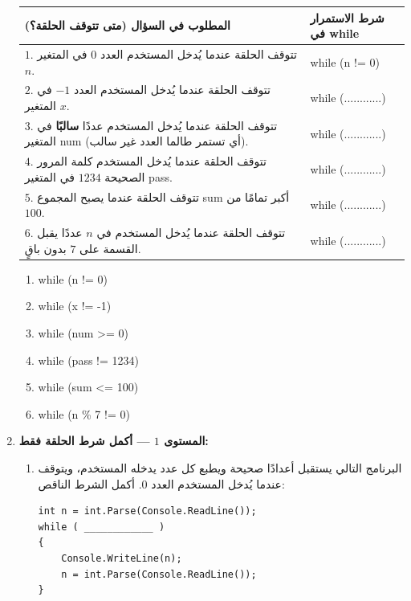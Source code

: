 \documentclass[14pt]{extarticle}
\begin{document}
\begin{enumerate}[itemsep=2em]
{\centering
\renewcommand{\arraystretch}{1.6}
\begin{tabular}{|>{\raggedleft\arraybackslash}p{}|>{\centering\arraybackslash}p{}|}
\hline
\textbf{المطلوب في السؤال (متى تتوقف الحلقة؟)} & \textbf{شرط الاستمرار في \textenglish{while}} \\
\hline
$1$. تتوقف الحلقة عندما يُدخل المستخدم العدد $0$ في المتغير $n$. & \textenglish{while (n != 0)} \\
\hline
$2$. تتوقف الحلقة عندما يُدخل المستخدم العدد $-1$ في المتغير $x$. & \textenglish{while (............)} \\
\hline
$3$. تتوقف الحلقة عندما يُدخل المستخدم عددًا \textbf{سالبًا} في المتغير \textenglish{num} (أي تستمر طالما العدد غير سالب). & \textenglish{while (............)} \\
\hline
$4$. تتوقف الحلقة عندما يُدخل المستخدم كلمة المرور الصحيحة $1234$ في المتغير \textenglish{pass}. & \textenglish{while (............)} \\
\hline
$5$. تتوقف الحلقة عندما يصبح المجموع \textenglish{sum} أكبر تمامًا من $100$. & \textenglish{while (............)} \\
\hline
$6$. تتوقف الحلقة عندما يُدخل المستخدم في $n$ عددًا يقبل القسمة على $7$ بدون باقٍ. & \textenglish{while (............)} \\
\hline
\end{tabular}
\par}
\ifwithsols
\begin{boxSolution}
\begin{enumerate}[nosep]
    \item \textenglish{while (n != 0)}
    \item \textenglish{while (x != -1)}
    \item \textenglish{while (num >= 0)}
    \item \textenglish{while (pass != 1234)}
    \item \textenglish{while (sum <= 100)}
    \item \textenglish{while (n \% 7 != 0)}
\end{enumerate}
\end{boxSolution}
\fi
\filbreak

\item \textbf{المستوى $1$ — أكمل شرط الحلقة فقط:}
\begin{enumerate}
    \item البرنامج التالي يستقبل أعدادًا صحيحة ويطبع كل عدد يدخله المستخدم، ويتوقف عندما يُدخل المستخدم العدد $0$. أكمل الشرط الناقص:
\begin{boxCode}
\begin{english}
\begin{verbatim}
int n = int.Parse(Console.ReadLine());
while ( ____________ )
{
    Console.WriteLine(n);
    n = int.Parse(Console.ReadLine());
}
\end{verbatim}
\end{english}
\end{boxCode}


\end{enumerate}
\end{enumerate}
\end{document}
